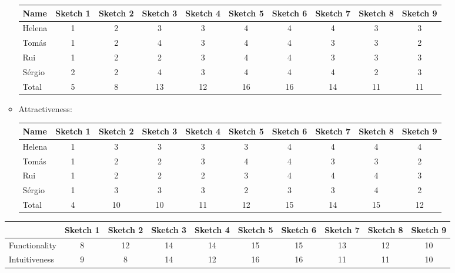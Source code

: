 \begin{itemize}
\begin{itemize}
\begin{table}[H]
                \begin{tabular}{l*{9}{c}}
                Name & Sketch 1 & Sketch 2 & Sketch 3 & Sketch 4 
                & Sketch 5 & Sketch 6 & Sketch 7 & Sketch 8 & Sketch 9 \\
                \hline 
                Helena & 1 & 2 & 3 & 3 & 4 & 4 & 4 & 3 & 3 \\
                Tomás & 1 & 2 & 4 & 3 & 4 & 4 & 3 & 3 & 2 \\ 
                Rui & 1 & 2 & 2 & 3 & 4 & 4 & 3 & 3 & 3 \\ 
                Sérgio & 2 & 2 & 4 & 3 & 4 & 4 & 4 & 2 & 3 \\ 
                \hline
                Total & 5 & 8 & 13 & 12 & 16 & 16 & 14 & 11 & 11 \\
                \end{tabular}
                \end{table}
            \item Attractiveness:
            \begin{table}[H]
                \begin{tabular}{l*{9}{c}}
                Name & Sketch 1 & Sketch 2 & Sketch 3 & Sketch 4 
                & Sketch 5 & Sketch 6 & Sketch 7 & Sketch 8 & Sketch 9 \\
                \hline 
                Helena & 1 & 3 & 3 & 3 & 3 & 4 & 4 & 4 & 4 \\
                Tomás & 1 & 2 & 2 & 3 & 4 & 4 & 3 & 3 & 2 \\ 
                Rui & 1 & 2 & 2 & 2 & 3 & 4 & 4 & 4 & 3 \\ 
                Sérgio & 1 & 3 & 3 & 3 & 2 & 3 & 3 & 4 & 2 \\ 
                \hline
                Total & 4 & 10 & 10 & 11 & 12 & 15 & 14 & 15 & 12 \\
                \end{tabular}
                \end{table}
    \end{itemize}
\begin{table}[H]
    \begin{tabular}{l*{9}{c}}
        & Sketch 1 & Sketch 2 & Sketch 3 & Sketch 4 
        & Sketch 5 & Sketch 6 & Sketch 7 & Sketch 8 & Sketch 9 \\
        \hline 
        Functionality & 8 & 12 & 14 & 14 & 15 & 15 & 13 & 12 & 10 \\
        Intuitiveness & 9 & 8 & 14 & 12 & 16 & 16 & 11 & 11 & 10 \\ 

\end{tabular}
\end{table}
\end{itemize}
